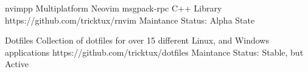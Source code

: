 

\begin{cvhonors}

  \cvhonor
    {nvimpp} %
    {Multiplatform Neovim msgpack-rpc C++ Library} %
		{https://github.com/tricktux/rnvim} %
    {Maintance Status: Alpha State}

  \cvhonor
    {Dotfiles} %
    {Collection of dotfiles for over 15 different Linux, and Windows applications} %
    {https://github.com/tricktux/dotfiles} %
    {Maintance Status: Stable, but Active}

\end{cvhonors}
